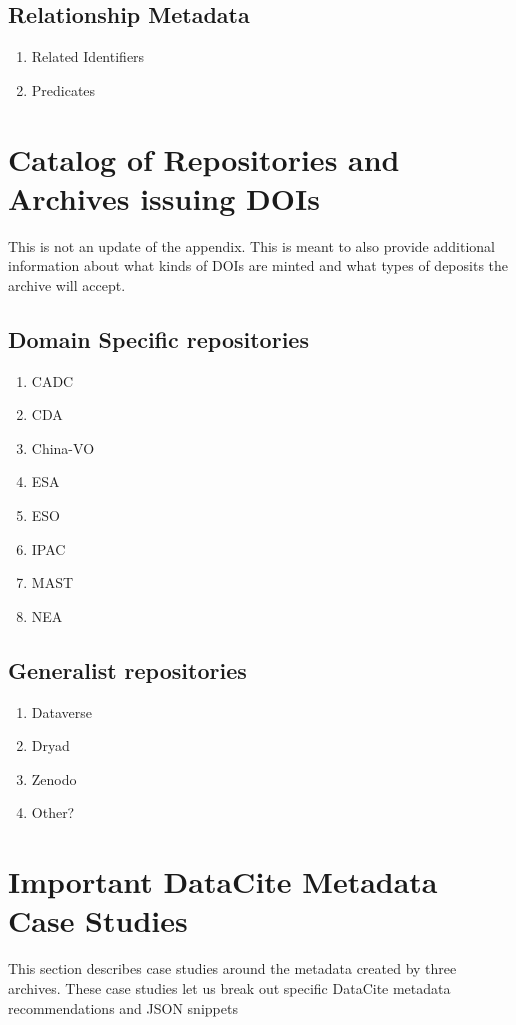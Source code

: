 \documentclass[11pt,a4paper]{ivoa}
\begin{document}
\subsection{Relationship Metadata}
\label{sec:bpmeta:related}
\begin{enumerate}
\item Related Identifiers
\item Predicates
\end{enumerate}


\appendix
\section{Catalog of Repositories and Archives issuing DOIs}
\label{sec:catalog}

This is not an update of the \citet{2022ApJS..260....5C} appendix. 
This is meant to also provide additional information about what kinds of DOIs are minted and what types of deposits the archive will accept.

\subsection{Domain Specific repositories}
\begin{enumerate}
\item CADC
\item CDA
\item China-VO
\item ESA
\item ESO
\item IPAC
\item MAST
\item NEA
\end{enumerate}

\subsection{Generalist repositories}
\begin{enumerate}
\item Dataverse
\item Dryad
\item Zenodo
\item Other?
\end{enumerate}


\section{Important DataCite Metadata Case Studies}
This section describes case studies around the metadata created by three archives. 
These case studies let us break out specific DataCite metadata recommendations and JSON snippets
\end{document}
